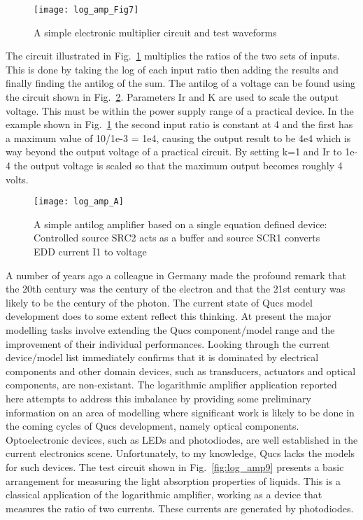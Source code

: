  \begin{figure} [here]
  \centering
  \texttt{[image: log\_amp\_Fig7]}
  \caption{A simple electronic multiplier circuit and test waveforms}
  \label{fig:log_amp7}
\end{figure} 
 
The circuit illustrated in Fig.~\ref{fig:log_amp7} multiplies the
ratios of the two sets of inputs.  This is done by taking the log of
each input ratio then adding the results and finally finding the
antilog of the sum. The antilog of a voltage can be found using the
circuit shown in Fig.~\ref{fig:log_ampA}. Parameters Ir and K are used
to scale the output voltage. This must be within the power supply
range of a practical device. In the example shown in
Fig.~\ref{fig:log_amp7} the second input ratio is constant at 4 and
the first has a maximum value of 10/1e-3 = 1e4, causing the output
result to be 4e4 which is way beyond the output voltage of a practical
circuit. By setting k=1 and Ir to 1e-4 the output voltage is scaled so
that the maximum output becomes roughly 4 volts.

 \begin{figure} [here]
  \centering
  \texttt{[image: log\_amp\_A]}
  \caption{A simple antilog amplifier based on a single equation defined device: Controlled source SRC2 acts as a buffer and source SCR1 converts EDD current I1 to voltage}
  \label{fig:log_ampA}
\end{figure} 


A number of years ago a colleague in Germany made the profound remark
that the 20th century was the century of the electron and that the
21st century was likely to be the century of the photon.  The current
state of Qucs model development does to some extent reflect this
thinking.  At present the major modelling tasks involve extending the
Qucs component/model range and the improvement of their individual
performances. Looking through the current device/model list
immediately confirms that it is dominated by electrical components and
other domain devices, such as transducers, actuators and optical
components, are non-existant. The logarithmic amplifier application
reported here attempts to address this imbalance by providing some
preliminary information on an area of modelling where significant work
is likely to be done in the coming cycles of Qucs development, namely
optical components. Optoelectronic devices, such as LEDs and
photodiodes, are well established in the current electronics
scene. Unfortunately, to my knowledge, Qucs lacks the models for such
devices. The test circuit shown in Fig.~\ref{fig:log_amp9} presents a
basic arrangement for measuring the light absorption properties of
liquids. This is a classical application of the logarithmic amplifier,
working as a device that measures the ratio of two currents. These
currents are generated by photodiodes.

